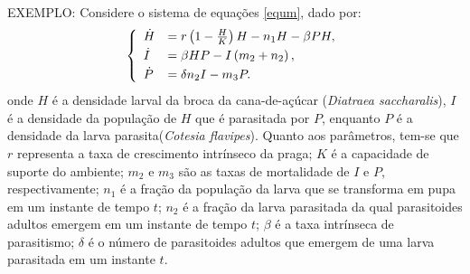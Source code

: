 EXEMPLO: Considere o sistema de equações \eqref{equm}, dado por:
\begin{eqnarray} \label{equm}
\left\{
\begin{array}{ll}
\vspace{0.1cm}
\displaystyle \dot{H} &= r\left(1-\frac{H}{K}\right) H-n_{1}H-\beta PH, \\
\vspace{0.1cm}
\displaystyle \dot{I} &= \beta HP - I\left(m_{2} + n_{2}\right),\\
\displaystyle \dot{P} &= \delta n_{2}I - m_{3}P.
\end{array}
\right.
\end{eqnarray}
onde $H$ é a densidade larval da broca da cana-de-açúcar (\textit{Diatraea saccharalis}), $I$ é a densidade da população de $H$ que é parasitada por $P$, enquanto $P$ é a densidade da larva parasita(\textit{Cotesia flavipes}). Quanto aos parâmetros, tem-se que $r$ representa a taxa de crescimento intrínseco da praga; $K$ é a capacidade de suporte do ambiente; $m_{2}$ e $m_3$ são as taxas de mortalidade de $I$ e $P$, respectivamente; $n_{1}$ é a fração da população da larva que se transforma em pupa em um instante de tempo $t$; $n_{2}$ é a fração da larva parasitada da qual parasitoides adultos emergem em um instante de tempo $t$; $\beta$ é a taxa intrínseca de parasitismo; $\delta$ é o número de parasitoides adultos que emergem de uma larva parasitada em um instante $t$.
